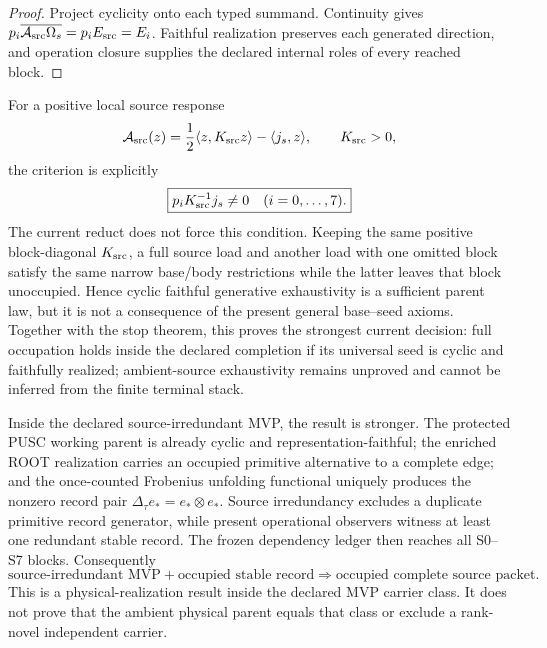 \documentclass[11pt]{article}
\begin{document}
\begin{proof}
Project cyclicity onto each typed summand. Continuity gives
$p_i\overline{\mathcal A_{\rm src}\Omega_s}=p_iE_{\rm src}=E_i$.
Faithful realization preserves each generated direction, and operation
closure supplies the declared internal roles of every reached block.
\end{proof}

For a positive local source response
\begin{equation}
 \mathcal A_{\rm src}(z)
 =\frac12\langle z,K_{\rm src}z\rangle-\langle j_s,z\rangle,
 \qquad K_{\rm src}>0,
\end{equation}
the criterion is explicitly
\begin{equation}
 \boxed{p_iK_{\rm src}^{-1}j_s\ne0\quad(i=0,\ldots,7).}
 \label{eq:full-source-occupation}
\end{equation}
The current reduct does not force this condition. Keeping the same positive
block-diagonal $K_{\rm src}$, a full source load and another load with one
omitted block satisfy the same narrow base/body restrictions while the latter
leaves that block unoccupied. Hence cyclic faithful generative exhaustivity is
a sufficient parent law, but it is not a consequence of the present general
base--seed axioms. Together with the stop theorem, this proves the strongest
current decision: full occupation holds inside the declared completion if its
universal seed is cyclic and faithfully realized; ambient-source exhaustivity
remains unproved and cannot be inferred from the finite terminal stack.

Inside the declared source-irredundant MVP, the result is stronger.
The protected PUSC working parent is already cyclic and representation-faithful;
the enriched ROOT realization carries an occupied primitive alternative to a
complete edge; and the once-counted Frobenius unfolding functional uniquely
produces the nonzero record pair
$\Delta_\tau e_*=e_*\otimes e_*$. Source irredundancy excludes a duplicate
primitive record generator, while present operational observers witness at
least one redundant stable record. The frozen dependency ledger then reaches
all S0--S7 blocks. Consequently
\begin{equation}
 \boxed{\text{source-irredundant MVP}+\text{occupied stable record}
 \Longrightarrow\text{occupied complete source packet}.}
 \label{eq:mvp-actual-occupation}
\end{equation}
This is a physical-realization result inside the declared MVP carrier class. It
does not prove that the ambient physical parent equals that class or exclude a
rank-novel independent carrier.
\end{document}

